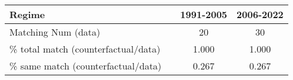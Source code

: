 
\begin{tabular}[t]{lccc}
\toprule
Regime &  & 1991-2005 & 2006-2022\\
\midrule
Matching Num (data) &  & 20 & 30\\
\% total match (counterfactual/data) &  & 1.000 & 1.000\\
\% same match (counterfactual/data) &  & 0.267 & 0.267\\
\bottomrule
\end{tabular}
